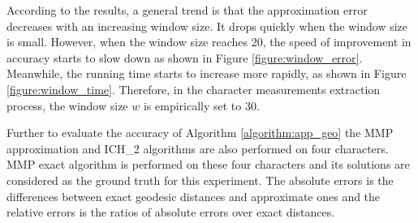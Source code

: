According to the results, a general trend is that the approximation error decreases with an increasing window size. It drops quickly when the window size is small. However, when the window size reaches 20, the speed of improvement in accuracy starts to slow down as shown in Figure \ref{figure:window_error}. Meanwhile, the running time starts to increase more rapidly, as shown in Figure \ref{figure:window_time}. Therefore, in the character measurements extraction process, the window size $w$ is empirically set to 30.

Further to evaluate the accuracy of Algorithm \ref{algorithm:app_geo} the MMP approximation and ICH\_2 algorithms are also performed on four characters. MMP exact algorithm is performed on these four characters and its solutions are considered as the ground truth for this experiment. The absolute errors is the differences between exact geodesic distances and approximate ones and the relative errors is the ratios of absolute errors over exact distances. 

